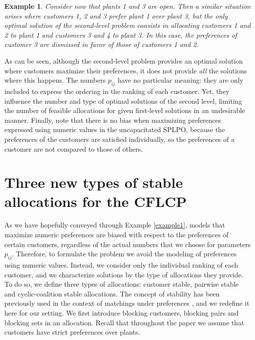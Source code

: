 \documentclass[preprint,11pt,authoryear]{elsarticle}
\newtheorem{example}{Example}
\begin{document}
\begin{example}
Consider now that plants 1 and 3 are open. Then a similar situation arises where customers 1, 2 and 3 prefer plant 1 over plant 3, but the \emph{only} optimal solution of the second-level problem consists in allocating customers 1 and 2 to plant 1 and customers 3 and 4 to plant 3. In this case, the preferences of customer 3 are dismissed in favor of those of customers 1 and 2.
\end{example}

As can be seen, although the second-level problem provides an optimal solution where customers maximize their preferences, it does not provide \emph{all} the solutions where this happens. The numbers $p_{ij}$ have no particular meaning: they are only included to express the ordering in the ranking of each customer. Yet, they influence the number and type of optimal solutions of the second level, limiting the number of feasible allocations for given first-level solutions in an undesirable manner. 
Finally, note that there is no bias when maximizing preferences expressed using numeric values in the uncapacitated SPLPO, because the preferences of the customers are satisfied individually, so the preferences of a customer are not compared to those of others.

\section{Three new types of stable allocations for the CFLCP} \label{sec:stableAllocations}
As we have hopefully conveyed through Example \ref{example1}, models that maximize numeric preferences are biased with respect to the preferences of certain customers, regardless of the actual numbers that we choose for parameters $p_{ij}$. Therefore, to formulate the problem we avoid the modeling of preferences using numeric values. Instead, we consider only the individual ranking of each customer, and we characterize solutions by the type of allocations they provide. To do so, we define three types of allocations: customer stable, pairwise stable and cyclic-coalition stable allocations. The concept of stability has been previously used in the context of matchings under preferences \citep[see][]{manlove2013}, and we redefine it here for our setting. We first introduce blocking customers, blocking pairs and blocking sets in an allocation. Recall that throughout the paper we assume that customers have strict preferences over plants.
\end{document}
